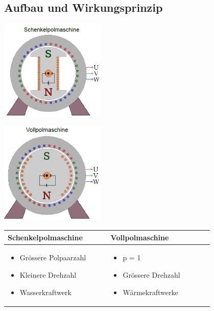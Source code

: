 \subsection{Aufbau und Wirkungsprinzip}
    \begin{minipage}[b]{0.5\linewidth}
    	\includegraphics[width = 5cm]{images/Schenkelpolmaschine}
    \end{minipage}
    \begin{minipage}[b]{0.5\linewidth}
    	\includegraphics[width = 5cm]{images/Vollpolmaschine}
    \end{minipage}
    \begin{tabular}[b]{| C{0.4\linewidth} | C{0.4\linewidth} |}
    	\hline
    	\textbf{Schenkelpolmaschine} &
        \textbf{Vollpolmaschine}
        \\ \hline
        
    	\vspace{-0.7cm}
    	\begin{itemize}
    		\item Grössere Polpaarzahl
    		\item Kleinere Drehzahl
    		\item Wasserkraftwerk
    	\end{itemize} &
        \vspace{-0.7cm}
        \begin{itemize}
        	\item p = 1
        	\item Grössere Drehzahl
        	\item Wärmekraftwerke
        \end{itemize}
        \\ \hline
    \end{tabular}
    \\
    
